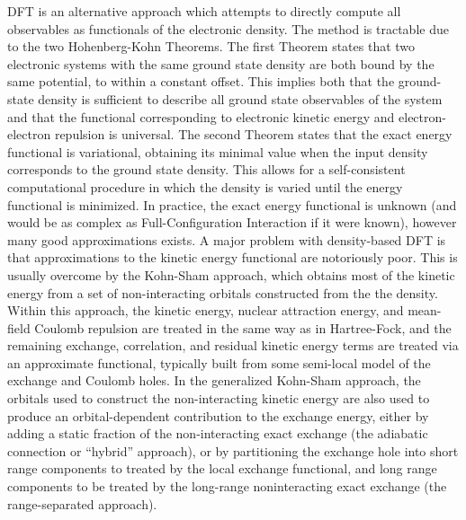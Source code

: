DFT is an alternative approach which attempts to directly compute all
observables as functionals of the electronic density. The method is tractable
due to the two Hohenberg-Kohn Theorems. The first Theorem states that two
electronic systems with the same ground state density are both bound by the same
potential, to within a constant offset. This implies both that the ground-state
density is sufficient to describe all ground state observables of the system and
that the functional corresponding to electronic kinetic energy and
electron-electron repulsion is universal. The second Theorem states that the
exact energy functional is variational, obtaining its minimal value when the
input density corresponds to the ground state density. This allows for a
self-consistent computational procedure in which the density is varied until the
energy functional is minimized. In practice, the exact energy functional is
unknown (and would be as complex as Full-Configuration Interaction if it were
known), however many good approximations exists. A major problem with
density-based DFT is that approximations to the kinetic energy functional are
notoriously poor. This is usually overcome by the Kohn-Sham approach, which
obtains most of the kinetic energy from a set of non-interacting orbitals
constructed from the the density. Within this approach, the kinetic energy,
nuclear attraction energy, and mean-field Coulomb repulsion are treated in the
same way as in Hartree-Fock, and the remaining exchange, correlation, and
residual kinetic energy terms are treated via an approximate functional,
typically built from some semi-local model of the exchange and Coulomb holes. In
the generalized Kohn-Sham approach, the orbitals used to construct the
non-interacting kinetic energy are also used to produce an orbital-dependent
contribution to the exchange energy, either by adding a static fraction of the
non-interacting exact exchange (the adiabatic connection or ``hybrid''
approach), or by partitioning the exchange hole into short range components to
treated by the local exchange functional, and long range components to be
treated by the long-range noninteracting exact exchange (the range-separated
approach).

